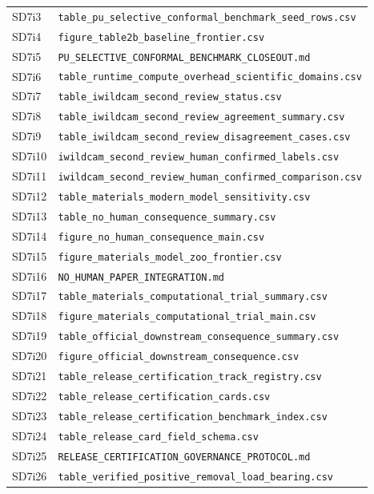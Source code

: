 \documentclass[11pt]{article}
\begin{document}
\begin{longtable}{ll}
SD7i3 & \texttt{table\_pu\_selective\_conformal\_benchmark\_seed\_rows.csv} \\
SD7i4 & \texttt{figure\_table2b\_baseline\_frontier.csv} \\
SD7i5 & \texttt{PU\_SELECTIVE\_CONFORMAL\_BENCHMARK\_CLOSEOUT.md} \\
SD7i6 & \texttt{table\_runtime\_compute\_overhead\_scientific\_domains.csv} \\
SD7i7 & \texttt{table\_iwildcam\_second\_review\_status.csv} \\
SD7i8 & \texttt{table\_iwildcam\_second\_review\_agreement\_summary.csv} \\
SD7i9 & \texttt{table\_iwildcam\_second\_review\_disagreement\_cases.csv} \\
SD7i10 & \texttt{iwildcam\_second\_review\_human\_confirmed\_labels.csv} \\
SD7i11 & \texttt{iwildcam\_second\_review\_human\_confirmed\_comparison.csv} \\
SD7i12 & \texttt{table\_materials\_modern\_model\_sensitivity.csv} \\
SD7i13 & \texttt{table\_no\_human\_consequence\_summary.csv} \\
SD7i14 & \texttt{figure\_no\_human\_consequence\_main.csv} \\
SD7i15 & \texttt{figure\_materials\_model\_zoo\_frontier.csv} \\
SD7i16 & \texttt{NO\_HUMAN\_PAPER\_INTEGRATION.md} \\
SD7i17 & \texttt{table\_materials\_computational\_trial\_summary.csv} \\
SD7i18 & \texttt{figure\_materials\_computational\_trial\_main.csv} \\
SD7i19 & \texttt{table\_official\_downstream\_consequence\_summary.csv} \\
SD7i20 & \texttt{figure\_official\_downstream\_consequence.csv} \\
SD7i21 & \texttt{table\_release\_certification\_track\_registry.csv} \\
SD7i22 & \texttt{table\_release\_certification\_cards.csv} \\
SD7i23 & \texttt{table\_release\_certification\_benchmark\_index.csv} \\
SD7i24 & \texttt{table\_release\_card\_field\_schema.csv} \\
SD7i25 & \texttt{RELEASE\_CERTIFICATION\_GOVERNANCE\_PROTOCOL.md} \\
SD7i26 & \texttt{table\_verified\_positive\_removal\_load\_bearing.csv} \\

\end{longtable}
\end{document}
